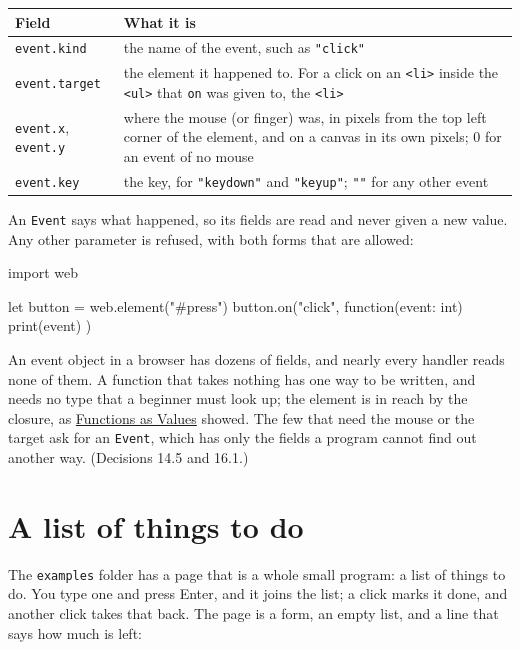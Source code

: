 \begin{longtable}{lP{8.4cm}}
\toprule
Field & What it is \\
\midrule
\endhead
\verb|event.kind| & the name of the event, such as \verb|"click"| \\
\verb|event.target| & the element it happened to. For a click on an
  \verb|<li>| inside the \verb|<ul>| that \verb|on| was given to, the
  \verb|<li>| \\
\verb|event.x|, \verb|event.y| & where the mouse (or finger) was, in
  pixels from the top left corner of the element, and on a canvas in its
  own pixels; 0 for an event of no mouse \\
\verb|event.key| & the key, for \verb|"keydown"| and \verb|"keyup"|;
  \verb|""| for any other event \\
\bottomrule
\end{longtable}

An \verb|Event| says what happened, so its fields are read and never
given a new value. Any other parameter is refused, with both forms
that are allowed:

\begin{zeno}[fails=yes]
import web

let button = web.element("#press")
button.on("click", function(event: int) {
    print(event)
})
\end{zeno}

\begin{why}
An event object in a browser has dozens of fields, and nearly every
handler reads none of them. A function that takes nothing has one way
to be written, and needs no type that a beginner must look up; the
element is in reach by the closure, as \hyperref[ch-function-values]{Functions
as Values} showed. The few that need the mouse or the target ask for
an \verb|Event|, which has only the fields a program cannot find out
another way. (Decisions 14.5 and 16.1.)
\end{why}

\section{A list of things to do}

The \verb|examples| folder has a page that is a whole small program: a
list of things to do. You type one and press Enter, and it joins the
list; a click marks it done, and another click takes that back. The
page is a form, an empty list, and a line that says how much is left:

\begin{zeno}[src=examples/todo.html, file=todo.html, dir=todo, run=no]
\end{zeno}

